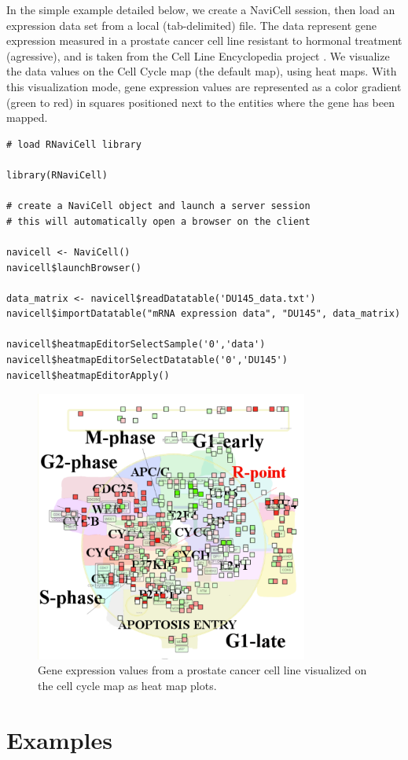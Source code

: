 \documentclass[article]{jss}
\begin{document}
In the simple example detailed below, we create a NaviCell session, then load
an expression data set from a local (tab-delimited) file. The data represent
gene expression measured in a prostate cancer cell line resistant to hormonal
treatment (agressive), and is taken from the Cell Line Encyclopedia project
\citep{barretina2012cancer}. We visualize the data values on the Cell Cycle map
(the default map), using heat maps. With this visualization mode, gene
expression values are represented as a color gradient (green to red) in
squares positioned next to the entities where the gene has been mapped.      


\begin{verbatim}
# load RNaviCell library

library(RNaviCell)

# create a NaviCell object and launch a server session
# this will automatically open a browser on the client 

navicell <- NaviCell()
navicell$launchBrowser()

data_matrix <- navicell$readDatatable('DU145_data.txt')
navicell$importDatatable("mRNA expression data", "DU145", data_matrix)

navicell$heatmapEditorSelectSample('0','data')
navicell$heatmapEditorSelectDatatable('0','DU145')
navicell$heatmapEditorApply()

\end{verbatim}

\begin{figure}[!ht]
  \caption{Gene expression values from a prostate cancer cell line visualized
on the cell cycle map as heat map plots.}
  \centering
    \includegraphics[width=0.8\textwidth]{figures/heatmap.pdf}
\end{figure}

\section[Examples]{Examples}

%

\end{document}
